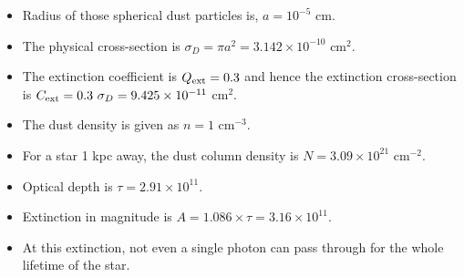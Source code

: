 \documentclass{jhwhw}
\begin{document}
\solution
\begin{itemize}
\item Radius of those spherical dust particles is, $a = 10^{-5}$ cm.
\item The physical cross-section is $\sigma_D = \pi a^2 = 3.142 \times 10^{-10}$ cm$^{2}$.
\item The extinction coefficient is $Q_{\rm{ext}} = 0.3$ and hence the extinction cross-section\\
is $C_{\rm{ext}} = 0.3 ~\sigma_D = 9.425 \times 10^{-11}$ cm$^{2}$.
\item The dust density is given as $n = 1$ cm$^{-3}$.
\item For a star 1 kpc away, the dust column density is $N = 3.09 \times 10^{21}$  cm$^{-2}$.
\item Optical depth is $\tau = 2.91 \times 10^{11}$.
\item Extinction in magnitude is $A = 1.086 \times \tau = 3.16 \times 10^{11}$.
\item At this extinction, not even a single photon can pass through for the whole lifetime of the star.
\end{itemize}
\end{document}
